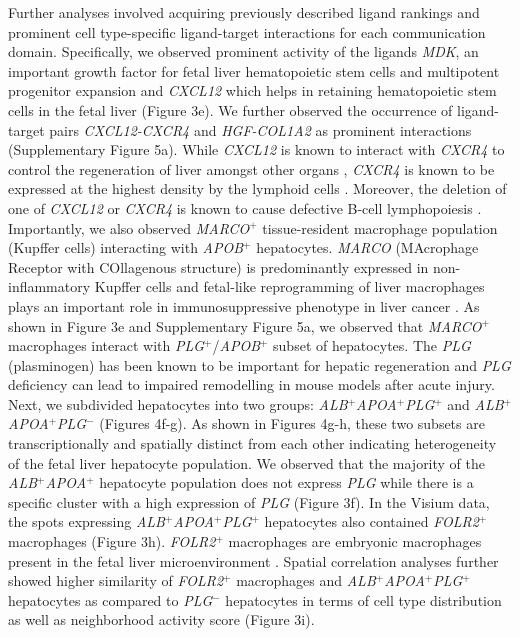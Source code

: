 Further analyses involved acquiring previously described ligand rankings and prominent cell type-specific ligand-target interactions for each communication domain. Specifically, we observed prominent activity of the ligands \textit{MDK}, an important growth factor for fetal liver hematopoietic stem cells and multipotent progenitor expansion \citep{Gao2022} and \textit{CXCL12} which helps in retaining hematopoietic stem cells in the fetal liver \citep{Lewis2021} (Figure 3e). We further observed the occurrence of ligand-target pairs \textit{CXCL12-CXCR4} and \textit{HGF-COL1A2} as prominent interactions (Supplementary Figure 5a). While \textit{CXCL12} is known to interact with \textit{CXCR4} to control the regeneration of liver amongst other organs \citep{10.3389/fimmu.2020.02109}, \textit{CXCR4} is known to be expressed at the highest density by the lymphoid cells \citep{https://doi.org/10.1002/SICI}. Moreover, the deletion of one of \textit{CXCL12} or \textit{CXCR4} is known to cause defective B-cell lymphopoiesis \citep{10.3389/fimmu.2020.02109}. Importantly, we also observed \textit{MARCO}$^+$ tissue-resident macrophage population (Kupffer cells) interacting with \textit{APOB}$^+$ hepatocytes. \textit{MARCO} (MAcrophage Receptor with COllagenous structure) is predominantly expressed in non-inflammatory Kupffer cells \citep{MacParland2018} and fetal-like reprogramming of liver macrophages plays an important role in immunosuppressive phenotype in liver cancer \citep{SHARMA2020377}. As shown in Figure 3e and Supplementary Figure 5a, we observed that \textit{MARCO}$^+$ macrophages interact with \textit{PLG}$^+$/\textit{APOB}$^+$ subset of hepatocytes. The \textit{PLG} (plasminogen) has been known to be important for hepatic regeneration \citep{doi:10.1073/pnas.96.26.15143,00001721-200809000-00006} and \textit{PLG} deficiency can lead to impaired remodelling in mouse models after acute injury. Next, we subdivided hepatocytes into two groups: \textit{ALB}$^+$\textit{APOA}$^+$\textit{PLG}$^+$ and \textit{ALB}$^+$\textit{APOA}$^+$\textit{PLG}$^-$ (Figures 4f-g). As shown in Figures 4g-h, these two subsets are transcriptionally and spatially distinct from each other indicating heterogeneity of the fetal liver hepatocyte population. We observed that the majority of the \textit{ALB}$^+$\textit{APOA}$^+$ hepatocyte population does not express \textit{PLG} while there is a specific cluster with a high expression of \textit{PLG} (Figure 3f). In the Visium data, the spots expressing \textit{ALB}$^+$\textit{APOA}$^+$\textit{PLG}$^+$ hepatocytes also contained \textit{FOLR2}$^+$ macrophages (Figure 3h). \textit{FOLR2}$^+$ macrophages are embryonic macrophages present in the fetal liver microenvironment \citep{SHARMA2020377}. Spatial correlation analyses further showed higher similarity of \textit{FOLR2}$^+$ macrophages and \textit{ALB}$^+$\textit{APOA}$^+$\textit{PLG}$^+$ hepatocytes as compared to \textit{PLG}$^-$ hepatocytes in terms of cell type distribution as well as neighborhood activity score (Figure 3i).\par
